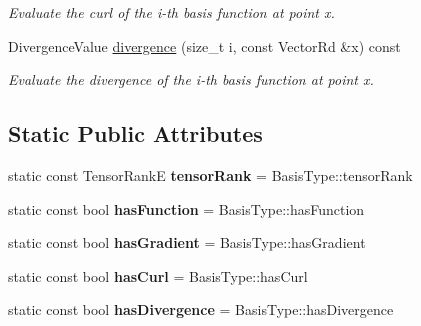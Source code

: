 \begin{DoxyCompactItemize}
\begin{DoxyCompactList}\small\item\em Evaluate the curl of the i-\/th basis function at point x. \end{DoxyCompactList}\item 
\mbox{\label{classHArDCore3D_1_1ShiftedBasis_a667f2913df630001dcc7d693662af926}} 
Divergence\+Value \hyperlink{classHArDCore3D_1_1ShiftedBasis_a667f2913df630001dcc7d693662af926}{divergence} (size\+\_\+t i, const Vector\+Rd \&x) const
\begin{DoxyCompactList}\small\item\em Evaluate the divergence of the i-\/th basis function at point x. \end{DoxyCompactList}\end{DoxyCompactItemize}
\subsection*{Static Public Attributes}
\begin{DoxyCompactItemize}
\item 
\mbox{\label{classHArDCore3D_1_1ShiftedBasis_a3aed71a500126a2f56662ca9e4cc8788}} 
static const Tensor\+RankE {\bfseries tensor\+Rank} = Basis\+Type\+::tensor\+Rank
\item 
\mbox{\label{classHArDCore3D_1_1ShiftedBasis_ac37f96b17e6954da1571f16593fcf0c6}} 
static const bool {\bfseries has\+Function} = Basis\+Type\+::has\+Function
\item 
\mbox{\label{classHArDCore3D_1_1ShiftedBasis_a7cca9d8dbc0ac24114ae1ba519eb6f60}} 
static const bool {\bfseries has\+Gradient} = Basis\+Type\+::has\+Gradient
\item 
\mbox{\label{classHArDCore3D_1_1ShiftedBasis_ae6469509558a028a4125c496270cbffc}} 
static const bool {\bfseries has\+Curl} = Basis\+Type\+::has\+Curl
\item 
\mbox{\label{classHArDCore3D_1_1ShiftedBasis_abdca69c0f60b7e305c887e16df8e4c26}} 
static const bool {\bfseries has\+Divergence} = Basis\+Type\+::has\+Divergence
\end{DoxyCompactItemize}


